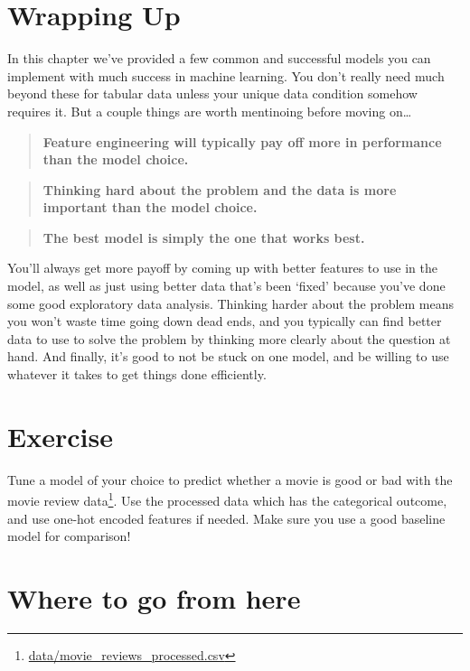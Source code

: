 \documentclass[
  letterpaper,
]{krantz}
\DeclareRobustCommand{\href}[2]{#2\footnote{\url{#1}}}
\begin{document}
\section{Wrapping Up}\label{wrapping-up-1}

In this chapter we've provided a few common and successful models you
can implement with much success in machine learning. You don't really
need much beyond these for tabular data unless your unique data
condition somehow requires it. But a couple things are worth mentinoing
before moving on\ldots{}

\begin{quote}
\textbf{Feature engineering will typically pay off more in performance
than the model choice.}
\end{quote}

\begin{quote}
\textbf{Thinking hard about the problem and the data is more important
than the model choice.}
\end{quote}

\begin{quote}
\textbf{The best model is simply the one that works best.}
\end{quote}

You'll always get more payoff by coming up with better features to use
in the model, as well as just using better data that's been `fixed'
because you've done some good exploratory data analysis. Thinking harder
about the problem means you won't waste time going down dead ends, and
you typically can find better data to use to solve the problem by
thinking more clearly about the question at hand. And finally, it's good
to not be stuck on one model, and be willing to use whatever it takes to
get things done efficiently.

\section{Exercise}\label{exercise-2}

Tune a model of your choice to predict whether a movie is good or bad
with the \href{data/movie_reviews_processed.csv}{movie review data}. Use
the processed data which has the categorical outcome, and use one-hot
encoded features if needed. Make sure you use a good baseline model for
comparison!

\section{Where to go from here}\label{where-to-go-from-here-2}
\end{document}
